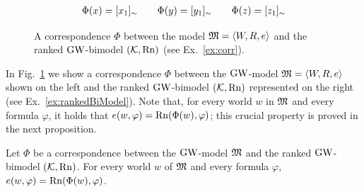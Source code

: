  
\begin{figure}[t]
  \centering
{}\begin{tikzpicture}[scale=0.7]
      
    \end{tikzpicture}
 \[
  \begin{array}{l}
    \Phi(x)=[x_1]_\sim \qquad \Phi(y)=[y_1]_\sim\qquad  \Phi(z)=[z_1]_\sim
  \end{array}
 \] 
          \caption{A correspondence $\Phi$ between the model $\mathfrak{M}=\langle W,R,e \rangle$ and the ranked   $\mbox{$\mathrm{GW}$}$-bimodel $(\mathcal{K},\mathrm{Rn})$
            (see  Ex.~\ref{ex:corr}).}
  \label{fig:modelCorrespondence}
\end{figure}





\begin{example}\label{ex:corr}
In    Fig.~\ref{fig:modelCorrespondence} we show a correspondence $\Phi$
between the  $\mbox{$\mathrm{GW}$}$-model $\mathfrak{M}=\langle W,R,e \rangle$  shown on  the left and 
the ranked $\mbox{$\mathrm{GW}$}$-bimodel $(\mathcal{K},\mathrm{Rn})$  represented on the right  (see Ex.~\ref{ex:rankedBiModel}).
 Note that, for every world $w$ in $\mathfrak{M}$ and every   formula $\varphi$,
 it holds that  $e(w,\varphi)=\mathrm{Rn}(\Phi(w),\varphi)$; this crucial property is proved in the next proposition. 
   \EndEx  
 \end{example}



\begin{proposition}\label{prop:Phi}
  Let $\Phi$ be a correspondence between the $\mbox{$\mathrm{GW}$}$-model $\mathfrak{M}$ and  the ranked $\mbox{$\mathrm{GW}$}$-bimodel $(\mathcal{K},\mathrm{Rn})$.
  For every world $w$ of $\mathfrak{M}$
and every   formula $\varphi$,
  $e(w,\varphi) =\mathrm{Rn}(\Phi(w),\varphi)$.
\end{proposition}



